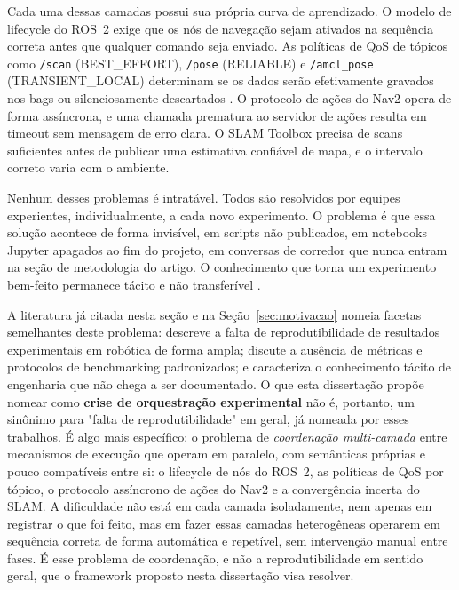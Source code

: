 Cada uma dessas camadas possui sua própria curva de aprendizado. O modelo de lifecycle
do ROS~2 \cite{macenski2022ros2} exige que os nós de navegação sejam ativados na
sequência correta antes que qualquer comando seja enviado. As políticas de QoS de
tópicos como \texttt{/\allowbreak scan} (BEST\_EFFORT), \texttt{/\allowbreak pose} (RELIABLE) e
\texttt{/\allowbreak amcl\_\allowbreak pose} (TRANSIENT\_LOCAL) determinam se os dados serão efetivamente
gravados nos bags ou silenciosamente descartados \cite{omgdds2015}. O protocolo de ações do Nav2
\cite{macenski2020marathon} opera de forma assíncrona, e uma chamada prematura ao
servidor de ações resulta em timeout sem mensagem de erro clara. O SLAM Toolbox
\cite{macenski2021slam} precisa de scans suficientes antes de publicar uma estimativa
confiável de mapa, e o intervalo correto varia com o ambiente.

Nenhum desses problemas é intratável. Todos são resolvidos por equipes experientes,
individualmente, a cada novo experimento. O problema é que essa solução acontece
de forma invisível, em scripts não publicados, em notebooks Jupyter apagados ao fim
do projeto, em conversas de corredor que nunca entram na seção de metodologia do artigo.
O conhecimento que torna um experimento bem-feito permanece tácito e não
transferível \cite{albonico2023}.

A literatura já citada nesta seção e na Seção~\ref{sec:motivacao} nomeia facetas
semelhantes deste problema:  descreve a falta de
reprodutibilidade de resultados experimentais em robótica de forma ampla;
 discute a ausência de métricas e protocolos de
benchmarking padronizados; e  caracteriza o
conhecimento tácito de engenharia que não chega a ser documentado. O que esta
dissertação propõe nomear como \textbf{crise de orquestração experimental} não é,
portanto, um sinônimo para "falta de reprodutibilidade" em geral, já nomeada por
esses trabalhos. É algo mais específico: o problema de \emph{coordenação
multi-camada} entre mecanismos de execução que operam em paralelo, com
semânticas próprias e pouco compatíveis entre si: o lifecycle de nós do
ROS~2, as políticas de QoS por tópico, o protocolo assíncrono de ações do Nav2
e a convergência incerta do SLAM. A dificuldade não está em cada camada
isoladamente, nem apenas em registrar o que foi feito, mas em fazer essas
camadas heterogêneas operarem em sequência correta de forma automática e
repetível, sem intervenção manual entre fases. É esse problema de coordenação,
e não a reprodutibilidade em sentido geral, que o framework proposto
nesta dissertação visa resolver.

